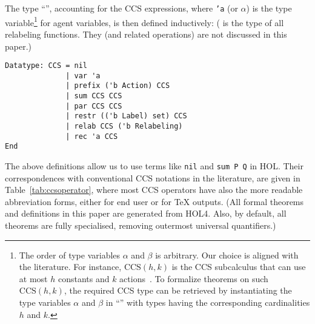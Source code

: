 The type ``'', accounting for the CCS
expressions, where \texttt{'a} (or $\alpha$) is the type variable\footnote{The order of type variables $\alpha$ and $\beta$
    is arbitrary. Our choice is aligned with  the literature.
For instance, $\mathrm{CCS}(h,k)$ is the CCS subcalculus that can use at most $h$ constants
and $k$ actions~\cite{gorrieri2017ccs}. To formalize theorems on
such $\mathrm{CCS}(h,k)$, the required CCS type can be retrieved by instantiating the type
variables $\alpha$ and $\beta$ in ``'' with types
having the corresponding cardinalities $h$ and $k$.} for
agent variables, is then defined inductively: ( is the type of all relabeling functions. They (and
  related operations) are not discussed in this paper.)
\begin{lstlisting}
Datatype: CCS = nil
              | var 'a
              | prefix ('b Action) CCS
              | sum CCS CCS
              | par CCS CCS
              | restr (('b Label) set) CCS
              | relab CCS ('b Relabeling)
              | rec 'a CCS
End
\end{lstlisting}
The above definitions allow us to use terms like \texttt{nil} and
\texttt{sum P Q} in HOL. Their correspondences with conventional CCS notations
in the literature, are given in Table~\ref{tab:ccsoperator}, where
most CCS operators have also the more readable abbreviation forms,
either for end user or for \TeX{} outputs. (All
  formal theorems and definitions in this paper
  are generated from HOL4. Also, by default, all theorems are fully
  specialised, removing outermost universal quantifiers.)

